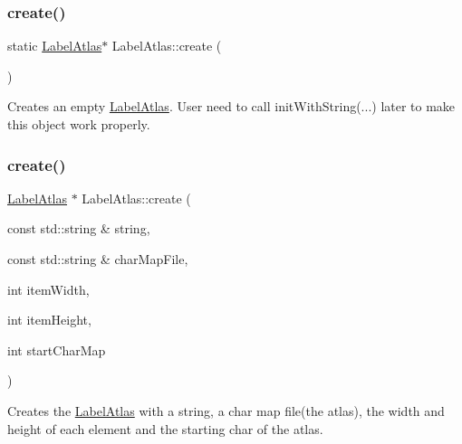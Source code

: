 \subsubsection{\texorpdfstring{create()}{create()}\hspace{0.1cm}{\footnotesize\ttfamily [2/6]}}
{\footnotesize\ttfamily static \hyperlink{classLabelAtlas}{Label\+Atlas}$\ast$ Label\+Atlas\+::create (\begin{DoxyParamCaption}{ }\end{DoxyParamCaption})\hspace{0.3cm}{\ttfamily [static]}}

Creates an empty \hyperlink{classLabelAtlas}{Label\+Atlas}. User need to call init\+With\+String(...) later to make this object work properly. \mbox{\label{classLabelAtlas_a0e07b68919ed3b5c4fb7f585d0d9e0eb}} 
\subsubsection{\texorpdfstring{create()}{create()}\hspace{0.1cm}{\footnotesize\ttfamily [3/6]}}
{\footnotesize\ttfamily \hyperlink{classLabelAtlas}{Label\+Atlas} $\ast$ Label\+Atlas\+::create (\begin{DoxyParamCaption}\item[{const std\+::string \&}]{string,  }\item[{const std\+::string \&}]{char\+Map\+File,  }\item[{int}]{item\+Width,  }\item[{int}]{item\+Height,  }\item[{int}]{start\+Char\+Map }\end{DoxyParamCaption})\hspace{0.3cm}{\ttfamily [static]}}

Creates the \hyperlink{classLabelAtlas}{Label\+Atlas} with a string, a char map file(the atlas), the width and height of each element and the starting char of the atlas. \mbox{\label{classLabelAtlas_a064e5f1e4e1183a64af95ee78ae1c3c0}} 
